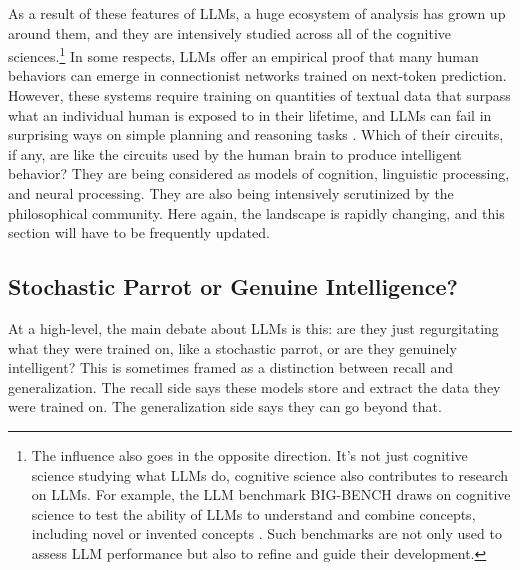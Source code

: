 As a result of these features of LLMs, a huge ecosystem of analysis has grown
up around them, and they are intensively studied across all of the cognitive
sciences.\footnote{The influence also goes in the opposite direction. It's not
just cognitive science studying what LLMs do, cognitive science also
contributes to research on LLMs. For example, the LLM benchmark BIG-BENCH draws
on cognitive science to test the ability of LLMs to understand and combine
concepts, including novel or invented concepts \cite{srivastava2022beyond}.
Such benchmarks are not only used to assess LLM performance but also to refine
and guide their development.} In some respects, LLMs offer an empirical proof
that many human behaviors can emerge in connectionist networks trained on
next-token prediction. However, these systems require training on quantities of
textual data that surpass what an individual human is exposed to in their
lifetime, and LLMs can fail in surprising ways on simple planning and reasoning
tasks \cite{momennejad2023cogeval}. Which of their circuits, if any, are like the
circuits used by the human brain to produce intelligent behavior? They are
being considered as models of cognition, linguistic processing, and neural
processing. They are also being intensively scrutinized by the philosophical
community. Here again, the landscape is rapidly changing, and this section will
have to be frequently updated.

\subsection{Stochastic Parrot or Genuine Intelligence?}\label{stochasticParrot}

At a high-level, the main debate about LLMs is this: are they just
regurgitating what they were trained on, like a stochastic parrot, or are they
genuinely intelligent? This is sometimes framed as a distinction between recall
and generalization. The recall side says these models store and extract the
data they were trained on. The generalization side says they can go beyond
that.

